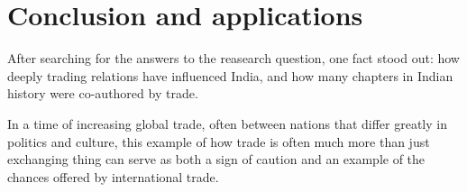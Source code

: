 \documentclass[11pt, a4paper, headings=standardclasses]{scrartcl}
\begin{document}
\section{Conclusion and applications}

After searching for the answers to the reasearch question, one fact stood out: how deeply trading relations have influenced India, and how many chapters in Indian history were co-authored by trade.

In a time of increasing global trade, often between nations that differ greatly in politics and culture, this example of how trade is often much more than just exchanging thing can serve as both a sign of caution and an example of the chances offered by international trade.

\clearpage
\appendix
{}
\printbibliography
\end{document}
